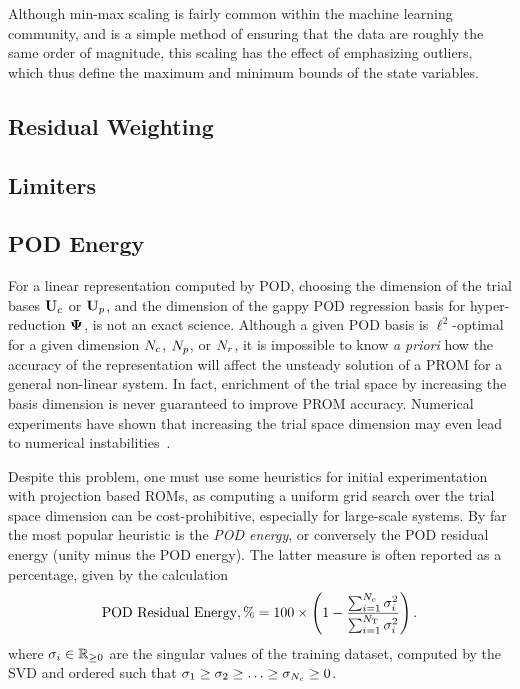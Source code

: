 \begin{enumerate}
	Although min-max scaling is fairly common within the machine learning community, and is a simple method of ensuring that the data are roughly the same order of magnitude, this scaling has the effect of emphasizing outliers, which thus define the maximum and minimum bounds of the state variables.
\end{enumerate}

\subsection{Residual Weighting}\label{subsec:resWeight}

\subsection{Limiters}

\subsection{POD Energy}

For a linear representation computed by POD, choosing the dimension of the trial bases $\consTrial$ or $\primTrial$, and the dimension of the gappy POD regression basis for hyper-reduction $\deimBasis$, is not an exact science. Although a given POD basis is $\ell^2$-optimal for a given dimension $N_c$, $N_p$, or $N_r$, it is impossible to know \textit{a priori} how the accuracy of the representation will affect the unsteady solution of a PROM for a general non-linear system. In fact, enrichment of the trial space by increasing the basis dimension is never guaranteed to improve PROM accuracy. Numerical experiments have shown that increasing the trial space dimension may even lead to numerical instabilities~\cite{Huang2022}.

Despite this problem, one must use some heuristics for initial experimentation with projection based ROMs, as computing a uniform grid search over the trial space dimension can be cost-prohibitive, especially for large-scale systems. By far the most popular heuristic is the \textit{POD energy}, or conversely the POD residual energy (unity minus the POD energy). The latter measure is often reported as a percentage, given by the calculation
%
\begin{equation}\label{eq:podEnergyResidual}
    \text{POD Residual Energy}, \% = 100 \times \left( 1 - \frac{\sum_{i=1}^{N_c} \sigma_{i}^2}{\sum_{i=1}^{N_{\text{T}}} \sigma_{i}^2} \right).
\end{equation}
%
where $\sigma_{i} \in \mathbb{R}_{\ge 0}$ are the singular values of the training dataset, computed by the SVD and ordered such that $\sigma_1 \ge \sigma_2 \ge \hdots \ge \sigma_{N_c} \ge 0$.

